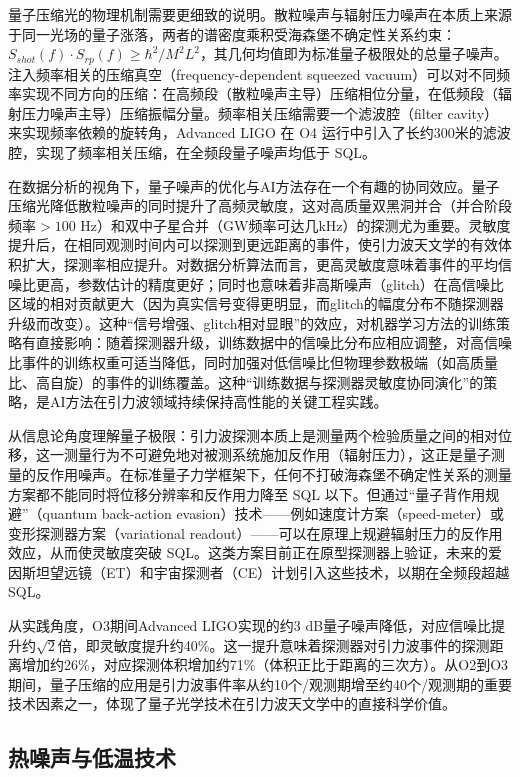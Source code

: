 量子压缩光的物理机制需要更细致的说明。散粒噪声与辐射压力噪声在本质上来源于同一光场的量子涨落，两者的谱密度乘积受海森堡不确定性关系约束：$S_{shot}(f) \cdot S_{rp}(f) \geq \hbar^2/M^2L^2$，其几何均值即为标准量子极限处的总量子噪声。注入频率相关的压缩真空（frequency-dependent squeezed vacuum）可以对不同频率实现不同方向的压缩：在高频段（散粒噪声主导）压缩相位分量，在低频段（辐射压力噪声主导）压缩振幅分量。频率相关压缩需要一个滤波腔（filter cavity）来实现频率依赖的旋转角，Advanced LIGO 在 O4 运行中引入了长约300米的滤波腔，实现了频率相关压缩，在全频段量子噪声均低于 SQL。

在数据分析的视角下，量子噪声的优化与AI方法存在一个有趣的协同效应。量子压缩光降低散粒噪声的同时提升了高频灵敏度，这对高质量双黑洞并合（并合阶段频率$>100$ Hz）和双中子星合并（GW频率可达几kHz）的探测尤为重要。灵敏度提升后，在相同观测时间内可以探测到更远距离的事件，使引力波天文学的有效体积扩大，探测率相应提升。对数据分析算法而言，更高灵敏度意味着事件的平均信噪比更高，参数估计的精度更好；同时也意味着非高斯噪声（glitch）在高信噪比区域的相对贡献更大（因为真实信号变得更明显，而glitch的幅度分布不随探测器升级而改变）。这种“信号增强、glitch相对显眼”的效应，对机器学习方法的训练策略有直接影响：随着探测器升级，训练数据中的信噪比分布应相应调整，对高信噪比事件的训练权重可适当降低，同时加强对低信噪比但物理参数极端（如高质量比、高自旋）的事件的训练覆盖。这种“训练数据与探测器灵敏度协同演化”的策略，是AI方法在引力波领域持续保持高性能的关键工程实践。

从信息论角度理解量子极限：引力波探测本质上是测量两个检验质量之间的相对位移，这一测量行为不可避免地对被测系统施加反作用（辐射压力），这正是量子测量的反作用噪声。在标准量子力学框架下，任何不打破海森堡不确定性关系的测量方案都不能同时将位移分辨率和反作用力降至 SQL 以下。但通过“量子背作用规避”（quantum back-action evasion）技术——例如速度计方案（speed-meter）或变形探测器方案（variational readout）——可以在原理上规避辐射压力的反作用效应，从而使灵敏度突破 SQL。这类方案目前正在原型探测器上验证，未来的爱因斯坦望远镜（ET）和宇宙探测者（CE）计划引入这些技术，以期在全频段超越 SQL。

从实践角度，O3期间Advanced LIGO实现的约3 dB量子噪声降低，对应信噪比提升约$\sqrt{2}$倍，即灵敏度提升约40\%。这一提升意味着探测器对引力波事件的探测距离增加约26\%，对应探测体积增加约71\%（体积正比于距离的三次方）。从O2到O3期间，量子压缩的应用是引力波事件率从约10个/观测期增至约40个/观测期的重要技术因素之一，体现了量子光学技术在引力波天文学中的直接科学价值。

\subsection{热噪声与低温技术}

